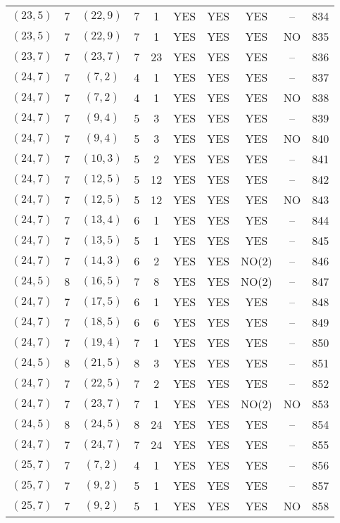 \begin{longtable}{|c|c|c|c|c|c|c|c|c|c|}
$(23, 5)$ & 7 & $(22, 9)$ & 7 & 1 & YES & YES & YES & -- & 834\\
$(23, 5)$ & 7 & $(22, 9)$ & 7 & 1 & YES & YES & YES & NO & 835\\
$(23, 7)$ & 7 & $(23, 7)$ & 7 & 23 & YES & YES & YES & -- & 836\\
$(24, 7)$ & 7 & $(7, 2)$ & 4 & 1 & YES & YES & YES & -- & 837\\
$(24, 7)$ & 7 & $(7, 2)$ & 4 & 1 & YES & YES & YES & NO & 838\\
$(24, 7)$ & 7 & $(9, 4)$ & 5 & 3 & YES & YES & YES & -- & 839\\
$(24, 7)$ & 7 & $(9, 4)$ & 5 & 3 & YES & YES & YES & NO & 840\\
$(24, 7)$ & 7 & $(10, 3)$ & 5 & 2 & YES & YES & YES & -- & 841\\
$(24, 7)$ & 7 & $(12, 5)$ & 5 & 12 & YES & YES & YES & -- & 842\\
$(24, 7)$ & 7 & $(12, 5)$ & 5 & 12 & YES & YES & YES & NO & 843\\
$(24, 7)$ & 7 & $(13, 4)$ & 6 & 1 & YES & YES & YES & -- & 844\\
$(24, 7)$ & 7 & $(13, 5)$ & 5 & 1 & YES & YES & YES & -- & 845\\
$(24, 7)$ & 7 & $(14, 3)$ & 6 & 2 & YES & YES & NO(2) & -- & 846\\
$(24, 5)$ & 8 & $(16, 5)$ & 7 & 8 & YES & YES & NO(2) & -- & 847\\
$(24, 7)$ & 7 & $(17, 5)$ & 6 & 1 & YES & YES & YES & -- & 848\\
$(24, 7)$ & 7 & $(18, 5)$ & 6 & 6 & YES & YES & YES & -- & 849\\
$(24, 7)$ & 7 & $(19, 4)$ & 7 & 1 & YES & YES & YES & -- & 850\\
$(24, 5)$ & 8 & $(21, 5)$ & 8 & 3 & YES & YES & YES & -- & 851\\
$(24, 7)$ & 7 & $(22, 5)$ & 7 & 2 & YES & YES & YES & -- & 852\\
$(24, 7)$ & 7 & $(23, 7)$ & 7 & 1 & YES & YES & NO(2) & NO & 853\\
$(24, 5)$ & 8 & $(24, 5)$ & 8 & 24 & YES & YES & YES & -- & 854\\
$(24, 7)$ & 7 & $(24, 7)$ & 7 & 24 & YES & YES & YES & -- & 855\\
$(25, 7)$ & 7 & $(7, 2)$ & 4 & 1 & YES & YES & YES & -- & 856\\
$(25, 7)$ & 7 & $(9, 2)$ & 5 & 1 & YES & YES & YES & -- & 857\\
$(25, 7)$ & 7 & $(9, 2)$ & 5 & 1 & YES & YES & YES & NO & 858\\

\end{longtable}
